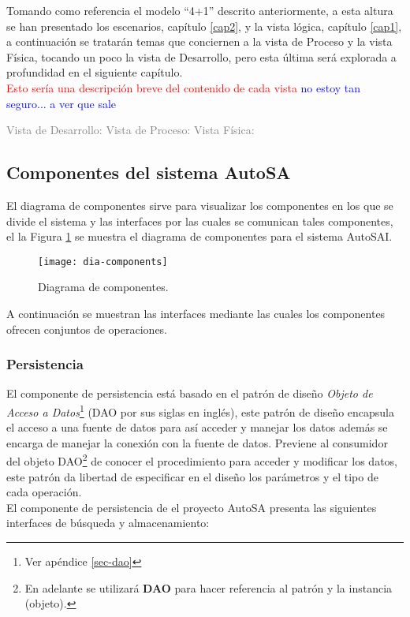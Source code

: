Tomando como referencia el modelo ``4+1'' descrito anteriormente, a esta altura se han presentado los escenarios, capítulo \ref{cap2}, y la vista lógica, capítulo \ref{cap1}, a continuación se tratarán temas que conciernen a la vista de Proceso y la vista Física, tocando un poco la vista de Desarrollo, pero esta última será explorada a profundidad en el siguiente capítulo.\\

\textcolor{red}{Esto sería una descripción breve del contenido de cada vista}
\textcolor{blue}{no estoy tan seguro... a ver que sale}

\textcolor{gray}{
Vista de Desarrollo:
Vista de Proceso:
Vista Física:
}


\subsection{Componentes del sistema AutoSA}
El diagrama de componentes sirve para visualizar los componentes en los que se divide el sistema y las interfaces por las cuales se comunican tales componentes, el la Figura \ref{fig:dia-components} se muestra el diagrama de componentes para el sistema AutoSAI.
\begin{figure}[h]
\centering
\texttt{[image: dia-components]}
\caption{Diagrama de componentes.}
\label{fig:dia-components}
\end{figure}

A continuación se muestran las interfaces mediante las cuales los componentes ofrecen conjuntos de operaciones.

\subsubsection{Persistencia}
El componente de persistencia está basado en el patrón de diseño \textit{Objeto de Acceso a Datos}\footnote{Ver apéndice \ref{sec-dao}} (DAO por sus siglas en inglés), este patrón de diseño encapsula el acceso a una fuente de datos para así acceder y manejar los datos además se encarga de manejar la conexión con la fuente de datos. Previene al consumidor del objeto DAO\footnote{En adelante se utilizará \textbf{DAO} para hacer referencia al patrón y la instancia (objeto).} de conocer el procedimiento para acceder y modificar los datos, este patrón da libertad de especificar en el diseño los parámetros y el tipo de cada operación\cite{OCPJavaSE7}.\\
El componente de persistencia de el proyecto AutoSA presenta las siguientes interfaces de búsqueda y almacenamiento:
